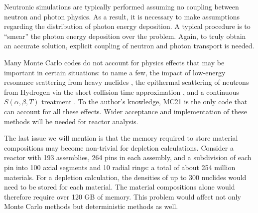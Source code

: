 Neutronic simulations are typically performed assuming no coupling between
neutron and photon physics. As a result, it is necessary to make assumptions
regarding the distribution of photon energy deposition. A typical procedure is
to ``smear'' the photon energy deposition over the problem. Again, to truly
obtain an accurate solution, explicit coupling of neutron and photon transport
is needed.

Many Monte Carlo codes do not account for physics effects that may be important
in certain situations: to name a few, the impact of low-energy resonance
scattering from heavy nuclides \cite{ane-becker-2009, physor-sunny-2012}, the
epithermal scattering of neutrons from Hydrogen via the short collision time
approximation \cite{mc-sutton-2009}, and a continuous $S(\alpha,\beta,T)$
treatment \cite{physor-pavlou-2012}. To the author's knowledge, MC21 is the only
code that can account for all these effects. Wider acceptance and implementation
of these methods will be needed for reactor analysis.

The last issue we will mention is that the memory required to store material
compositions may become non-trivial for depletion calculations. Consider a
reactor with 193 assemblies, 264 pins in each assembly, and a subdivision of
each pin into 100 axial segments and 10 radial rings: a total of about 254
million materials. For a depletion calculation, the densities of up to 300
nuclides would need to be stored for each material. The material compositions
alone would therefore require over 120 GB of memory. This problem would affect
not only Monte Carlo methods but deterministic methods as well.
